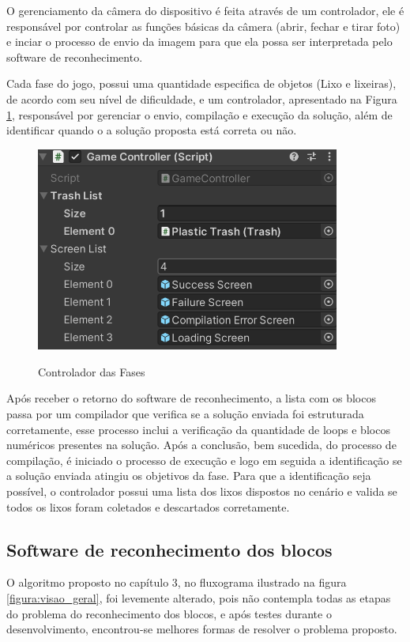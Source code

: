     O gerenciamento da câmera do dispositivo é feita através de um controlador, ele é responsável por controlar as funções básicas da câmera (abrir, fechar e tirar foto) e inciar o processo de envio da imagem para que ela possa ser interpretada pelo software de reconhecimento.
    
    Cada fase do jogo, possui uma quantidade especifica de objetos (Lixo e lixeiras), de acordo com seu nível de dificuldade, e um controlador, apresentado na Figura \ref{figura:controlador_fases}, responsável por gerenciar o envio, compilação e execução da solução, além de identificar quando o a solução proposta está correta ou não. 
    
    \begin{figure}[H]
        \caption{Controlador das Fases}
        \centering
        \includegraphics[width=10cm]{Imagens/Cap4/controlador_fases.png}
        \label{figura:controlador_fases}
    \end{figure}
    
    Após receber o retorno do software de reconhecimento, a lista com os blocos passa por um compilador que verifica se a solução enviada foi estruturada corretamente, esse processo inclui a verificação da quantidade de loops e blocos numéricos presentes na solução. Após a conclusão, bem sucedida, do processo de compilação, é iniciado o processo de execução e logo em seguida a identificação se a solução enviada atingiu os objetivos da fase. Para que a identificação seja possível, o controlador possui uma lista dos lixos dispostos no cenário e valida se todos os lixos foram coletados e descartados corretamente.
    
    
    \subsection{Software de reconhecimento dos blocos}
    O algoritmo proposto no capítulo 3, no fluxograma ilustrado na figura \ref{figura:visao_geral},  foi levemente alterado, pois não contempla todas as etapas do problema do reconhecimento dos blocos, e após testes durante o desenvolvimento, encontrou-se melhores formas de resolver o problema proposto.
    
